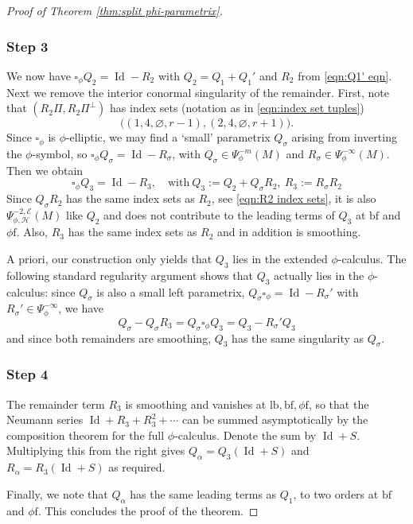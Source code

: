 \documentclass[11pt]{article}
\numberwithin{equation}{section}
\theoremstyle{plain}
\theoremstyle{definition}
\newcommand\calE{{\mathcal E}}
\newcommand{\phif}{{\phi\mathrm{f}}}
\newcommand{\lf}{{\mathrm{lb}}}
\newcommand{\bbf}{{\mathrm{bf}}}
\DeclareMathOperator{\Id}{Id}
\newcommand{\Piperp}{\Pi^\perp}
\begin{document}
\begin{proof}[Proof of Theorem \ref{thm:split phi-parametrix}]
\subsubsection*{Step 3}
We now have $\square_\phi Q_2 = \Id - R_2$ with $Q_2=Q_1+Q_1'$ and $R_2$ from \eqref{eqn:Q1' eqn}.
Next we remove the interior conormal singularity of the remainder. First, note that $(R_2\Pi, R_2\Piperp)$
has index sets (notation as in \eqref{eqn:index set tuples})
\begin{equation}
\label{eqn:R2 index sets}
\bigl((1,4,\varnothing,r-1), (2,4,\varnothing,r+1) \bigr).
\end{equation}
Since $\square_\phi$ is $\phi$-elliptic, we may find a `small' parametrix $Q_\sigma$
arising from inverting the $\phi$-symbol, so $\square_\phi Q_\sigma = \Id -R_\sigma$,
with $Q_\sigma \in \Psi^{-m}_\phi(M)$ and $R_\sigma \in \Psi^{-\infty}_\phi(M)$.
Then we obtain
\[
\square_\phi Q_3=\Id - R_3, \quad \text{with} \ Q_3:=Q_2 + Q_\sigma R_2, \ R_3:= R_\sigma R_2
\]
Since $Q_\sigma R_2$ has the same index sets as $R_2$, see \eqref{eqn:R2 index sets}, it is
also $\Psi^{-2,\calE}_{\phi, \mathscr{H}}(M)$ like $Q_2$ and does not contribute to the leading terms
of $Q_3$ at $\bbf$ and $\phif$. Also, $R_3$ has the same index sets as $R_2$ and in addition is smoothing.

A priori, our construction only yields that $Q_3$ lies in the extended $\phi$-calculus.
The following standard regularity argument shows that $Q_3$ actually lies in the $\phi$-calculus: since $Q_\sigma$ is also a small left parametrix, $Q_\sigma\square_\phi=\Id - R_{\sigma}'$ with $R_{\sigma}'\in\Psi^{-\infty}_\phi$, we have
\[
Q_\sigma - Q_\sigma R_3 = Q_\sigma \square_\phi Q_3 = Q_3 - R_{\sigma}' Q_3
\]
and since both remainders are smoothing, $Q_3$ has the same singularity as $Q_\sigma$.

\subsubsection*{Step 4}
The remainder term $R_3$ is smoothing and vanishes at $\lf,\bbf,\phif$, so that the Neumann series $\Id+R_3+R_3^2+\cdots$ can be summed asymptotically by the composition theorem for the full $\phi$-calculus. Denote the sum by $\Id+S$. Multiplying this from the right gives $Q_\alpha =Q_3(\Id+S)$ and $R_\alpha=R_3(\Id+S)$ as required.

Finally, we note that $Q_\alpha$ has the same leading terms as $Q_1$, to two orders at $\bbf$ and $\phif$.
This concludes the proof of the theorem.
\end{proof}
\end{document}
